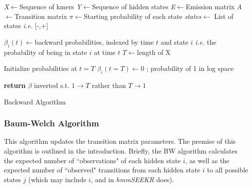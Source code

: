 \begin{algorithm}[H]
\DontPrintSemicolon
{}
\SetAlgoLined
\emph{X}$\leftarrow$Sequence of kmers\;
\emph{Y}$\leftarrow$Sequence of hidden states\;
\emph{E}$\leftarrow$Emission matrix\;
\emph{A}$\leftarrow$Transition matrix\;
\emph{$\pi$}$\leftarrow$Starting probability of each state\;
\emph{states}$\leftarrow$ List of states \emph{i.e.} [-,+]\;
\;

$\beta_i(t)\leftarrow$backward probabilities, indexed by time $t$ and state $i$ \emph{i.e.} the probability of being in state $i$ at time $t$\;
$T\leftarrow$length of X\;\; 

Initialize probabilities at $t=T$\;
$\beta_i(t=T)\leftarrow 0$ ; probability of 1 in log space\;\;

\textbf{return} $\beta$ inverted s.t. $1\rightarrow T$ rather than $T \rightarrow 1$\;
 \caption{Backward Algorithm}
 \label{alg:bwd}
\end{algorithm}

\subsubsection{Baum-Welch Algorithm}
This algorithm updates the transition matrix parameters. The premise of this algorithm is outlined in the introduction. Briefly, the BW algorithm calculates the expected number of ``observations" of each hidden state $i$, as well as the expected number of ``observed" transitions from each hidden state $i$ to all possible states $j$ (which may include $i$, and in \textit{hmmSEEKR} does). 

